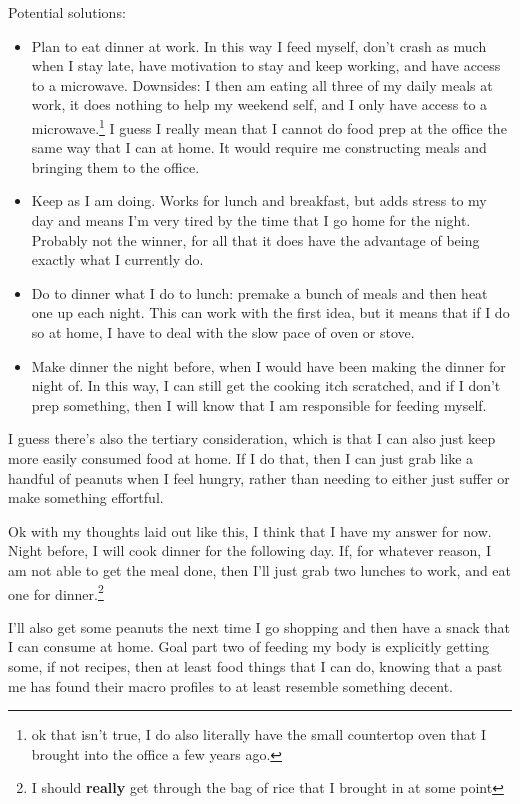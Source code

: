 \documentclass[12pt]{article}[titlepage]
\renewcommand{\,}{\textsuperscript{,}}
\begin{document}
Potential solutions:  
\begin{itemize}  
\item Plan to eat dinner at work. In this way I feed myself, don't crash as much when I stay late, have motivation to stay and keep working, and have access to a microwave.  
Downsides: I then am eating all three of my daily meals at work, it does nothing to help my weekend self, and I only have access to a microwave.\footnote{ok that isn't true, I do also literally have the small countertop oven that I brought into the office a few years ago.}  
I guess I really mean that I cannot do food prep at the office the same way that I can at home.  
It would require me constructing meals and bringing them to the office.

\item Keep as I am doing. Works for lunch and breakfast, but adds stress to my day and means I'm very tired by the time that I go home for the night. Probably not the winner, for all that it does have the advantage of being exactly what I currently do.

\item Do to dinner what I do to lunch: premake a bunch of meals and then heat one up each night. This can work with the first idea, but it means that if I do so at home, I have to deal with the slow pace of oven or stove.

\item Make dinner the night before, when I would have been making the dinner for night of.  
In this way, I can still get the cooking itch scratched, and if I don't prep something, then I will know that I am responsible for feeding myself.  
\end{itemize}

I guess there's also the tertiary consideration, which is that I can also just keep more easily consumed food at home.  
If I do that, then I can just grab like a handful of peanuts when I feel hungry, rather than needing to either just suffer or make something effortful.

Ok with my thoughts laid out like this, I think that I have my answer for now.  
Night before, I will cook dinner for the following day.  
If, for whatever reason, I am not able to get the meal done, then I'll just grab two lunches to work, and eat one for dinner.\footnote{I should \textbf{really} get through the bag of rice that I brought in at some point}

I'll also get some peanuts the next time I go shopping and then have a snack that I can consume at home.  
Goal part two of feeding my body is explicitly getting some, if not recipes, then at least food things that I can do, knowing that a past me has found their macro profiles to at least resemble something decent.
\end{document}
